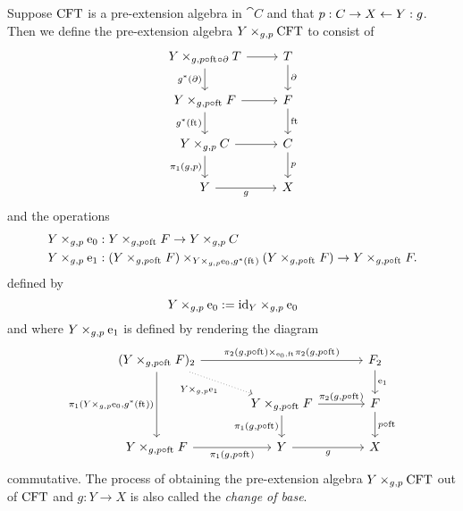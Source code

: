 \begin{defn}\label{cobesys}
Suppose $\mathrm{CFT}$ is a pre-extension algebra in $\cat{C}$ and that 
$p:C\rightarrow X\leftarrow Y:g$.
Then we define the pre-extension algebra $\cobesys{Y}{\stesys}{g}{p}$ to consist of
\begin{equation*}
\begin{tikzcd}
\cobesys{Y}{\stesyst}{g}{p\circ\eft\circ\ebd}
  \ar{r}
  \ar{d}[swap]{g^\ast(\ebd)}
  &
\stesyst
  \ar{d}{\ebd}
  \\
\cobesys{Y}{\stesysf}{g}{p\circ\eft}
  \ar{r}
  \ar{d}[swap]{g^\ast(\eft)}
  &
\stesysf
  \ar{d}{\eft}
  \\
\cobesys{Y}{\stesysc}{g}{p}
  \ar{r}
  \ar{d}[swap]{\pullbackpr{1}{g}{p}}
  &
\stesysc
  \ar{d}{p}
  \\
Y \ar{r}[swap]{g}
  &
X
\end{tikzcd}
\end{equation*} 
and the operations
\begin{align*}
\cobesys{Y}{\ectxext}{g}{p} 
  & : \pullback{Y}{\stesysf}{g}{p\circ\eft}\to \pullback{Y}{\stesysc}{g}{p}\\
\cobesys{Y}{\efamext}{g}{p} 
  & : \pullback
    {\pullback{Y}{\stesysf}{g}{p\circ\eft}}
    {\pullback{Y}{\stesysf}{g}{p\circ\eft}}
    {\cobesys{Y}{\ectxext}{g}{p}}
    {g^\ast(\eft)}
  \to 
  \pullback{Y}{\stesysf}{g}{p\circ\eft}.
\end{align*}
defined by
\begin{equation*}
\cobesys{Y}{\ectxext}{g}{p} := \pullback{\catid{Y}}{\ectxext}{g}{p}
\end{equation*}
and where $\cobesys{Y}{\efamext}{g}{p}$ is defined by rendering the diagram
\begin{equation*}
\begin{tikzcd}[column sep=large]
(\cobesys{Y}{\stesysf}{g}{p\circ\eft})_2
  \ar{rr}{\pullback{\pullbackpr{2}{g}{p\circ\eft}}{\pullbackpr{2}{g}{p\circ\eft}}{\ectxext}{\eft}}
  \ar{dd}[swap]{\pullbackpr{1}{\cobesys{Y}{\ectxext}{g}{p}}{g^\ast(\eft)}}
  \ar[dotted]{dr}[swap]{\cobesys{Y}{\efamext}{g}{p}}
  &
  &
\stesysf_2
  \ar{d}{\efamext}
  \\
  {}&
\cobesys{Y}{\stesysf}{g}{p\circ\eft}
  \ar{r}{\pullbackpr{2}{g}{p\circ\eft}}
  \ar{d}[swap]{\pullbackpr{1}{g}{p\circ\eft}}
  &
\stesysf
  \ar{d}{p\circ\eft}
  \\
\cobesys{Y}{\stesysf}{g}{p\circ\eft}
  \ar{r}[swap]{\pullbackpr{1}{g}{p\circ\eft}}
  &
Y \ar{r}[swap]{g}
  &
X
\end{tikzcd}
\end{equation*} 
commutative. 
The process of obtaining the pre-extension algebra $\cobesys{Y}{\stesys}{g}{p}$ out of $\mathrm{CFT}$
and $g:Y\to X$ is also called the \emph{change of base}.
\end{defn}

